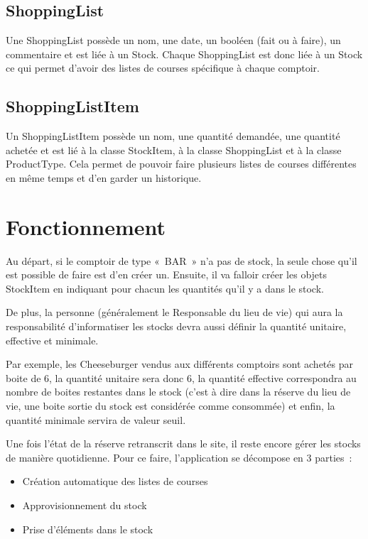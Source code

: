 \documentclass[a4paper]{report}
\begin{document}
\subsection{ShoppingList}
\par Une ShoppingList possède un nom, une date, un booléen (fait ou à faire), un commentaire et est liée à un Stock. Chaque ShoppingList est donc liée à un Stock ce qui permet d’avoir des listes de courses spécifique à chaque comptoir.

\subsection{ShoppingListItem}
\par Un ShoppingListItem possède un nom, une quantité demandée, une quantité achetée et est lié à la classe StockItem, à la classe ShoppingList et à la classe ProductType. Cela permet de pouvoir faire plusieurs listes de courses différentes en même temps et d’en garder un historique.

\section{Fonctionnement}
\label{sec:fonctionnement}

\par Au départ, si le comptoir de type « BAR » n’a pas de stock, la seule chose qu’il est possible de faire est d’en créer un. Ensuite, il va falloir créer les objets StockItem en indiquant pour chacun les quantités qu’il y a dans le stock.

\par De plus, la personne (généralement le Responsable du lieu de vie) qui aura la responsabilité d’informatiser les stocks devra aussi définir la quantité unitaire, effective et minimale.
\par Par exemple, les Cheeseburger vendus aux différents comptoirs sont achetés par boite de 6, la quantité unitaire sera donc 6, la quantité effective correspondra au nombre de boites restantes dans le stock (c’est à dire dans la réserve du lieu de vie, une boite sortie du stock est considérée comme consommée) et enfin, la quantité minimale servira de valeur seuil.
\par Une fois l’état de la réserve retranscrit dans le site, il reste encore gérer les stocks de manière quotidienne. Pour ce faire, l’application se décompose en 3 parties :
\begin{itemize}
    \item Création automatique des listes de courses
    \item Approvisionnement du stock
    \item Prise d’éléments dans le stock
\end{itemize}
\end{document}
